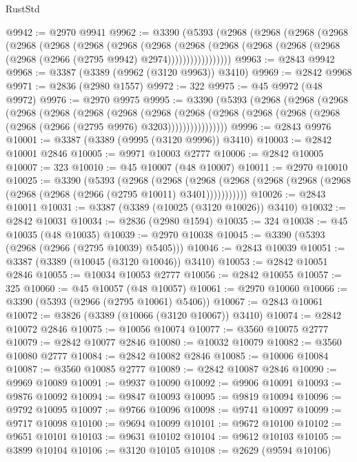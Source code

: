 \begin{lexlean}{RustStd}
\begin{coremodule}
@9942 := @2970 @9941
@9962 := @3390
    (@5393
      (@2968
        (@2968
          (@2968
            (@2968
              (@2968
                (@2968
                  (@2968
                    (@2968
                      (@2968
                        (@2968
                          (@2968
                            (@2968 (@2968 (@2968 (@2968 (@2966 (@2795 @9942) @2974)))))))))))))))))
@9963 := @2843 @9942
@9968 := @3387 (@3389 (@9962 (@3120 @9963)) @3410)
@9969 := @2842 @9968
@9971 := @2836 (@2980 @1557)
@9972 := 322
@9975 := @45 @9972 (@48 @9972)
@9976 := @2970 @9975
@9995 := @3390
    (@5393
      (@2968
        (@2968
          (@2968
            (@2968
              (@2968
                (@2968
                  (@2968
                    (@2968
                      (@2968
                        (@2968
                          (@2968 (@2968 (@2968 (@2968 (@2966 (@2795 @9976) @3203))))))))))))))))
@9996 := @2843 @9976
@10001 := @3387 (@3389 (@9995 (@3120 @9996)) @3410)
@10003 := @2842 @10001 @2846
@10005 := @9971 @10003 @2777
@10006 := @2842 @10005
@10007 := 323
@10010 := @45 @10007 (@48 @10007)
@10011 := @2970 @10010
@10025 := @3390
    (@5393
      (@2968
        (@2968
          (@2968 (@2968 (@2968 (@2968 (@2968 (@2968 (@2968 (@2966 (@2795 @10011) @3401)))))))))))
@10026 := @2843 @10011
@10031 := @3387 (@3389 (@10025 (@3120 @10026)) @3410)
@10032 := @2842 @10031
@10034 := @2836 (@2980 @1594)
@10035 := 324
@10038 := @45 @10035 (@48 @10035)
@10039 := @2970 @10038
@10045 := @3390 (@5393 (@2968 (@2966 (@2795 @10039) @5405)))
@10046 := @2843 @10039
@10051 := @3387 (@3389 (@10045 (@3120 @10046)) @3410)
@10053 := @2842 @10051 @2846
@10055 := @10034 @10053 @2777
@10056 := @2842 @10055
@10057 := 325
@10060 := @45 @10057 (@48 @10057)
@10061 := @2970 @10060
@10066 := @3390 (@5393 (@2966 (@2795 @10061) @5406))
@10067 := @2843 @10061
@10072 := @3826 (@3389 (@10066 (@3120 @10067)) @3410)
@10074 := @2842 @10072 @2846
@10075 := @10056 @10074
@10077 := @3560 @10075 @2777
@10079 := @2842 @10077 @2846
@10080 := @10032 @10079
@10082 := @3560 @10080 @2777
@10084 := @2842 @10082 @2846
@10085 := @10006 @10084
@10087 := @3560 @10085 @2777
@10089 := @2842 @10087 @2846
@10090 := @9969 @10089
@10091 := @9937 @10090
@10092 := @9906 @10091
@10093 := @9876 @10092
@10094 := @9847 @10093
@10095 := @9819 @10094
@10096 := @9792 @10095
@10097 := @9766 @10096
@10098 := @9741 @10097
@10099 := @9717 @10098
@10100 := @9694 @10099
@10101 := @9672 @10100
@10102 := @9651 @10101
@10103 := @9631 @10102
@10104 := @9612 @10103
@10105 := @3899 @10104
@10106 := @3120 @10105
@10108 := @2629 (@9594 @10106)

\end{coremodule}
\end{lexlean}
